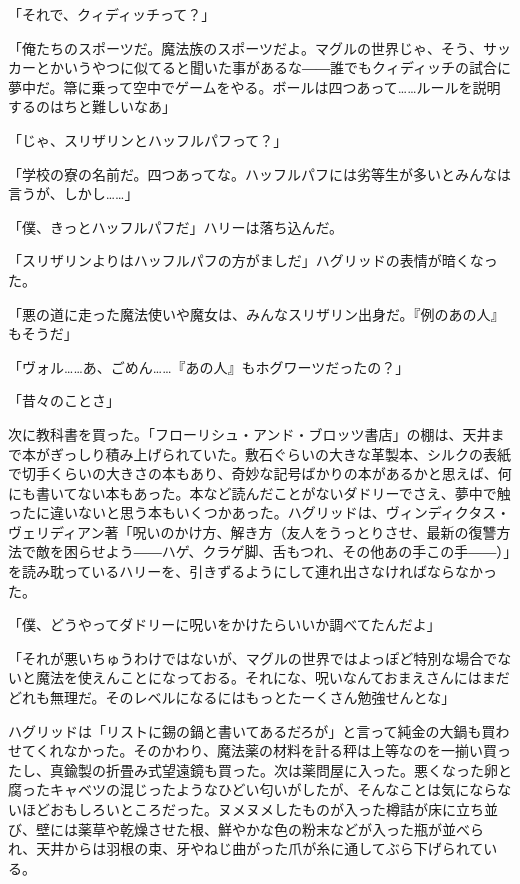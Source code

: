 \documentclass[10pt,a4paper]{article}
\begin{document}
\begin{CJK}{UTF8}{min}
「それで、クィディッチって？」

「俺たちのスポーツだ。魔法族のスポーツだよ。マグルの世界じゃ、そう、サッカーとかいうやつに似てると聞いた事があるな――誰でもクィディッチの試合に夢中だ。箒に乗って空中でゲームをやる。ボールは四つあって……ルールを説明するのはちと難しいなあ」

「じゃ、スリザリンとハッフルパフって？」

「学校の寮の名前だ。四つあってな。ハッフルパフには劣等生が多いとみんなは言うが、しかし……」

「僕、きっとハッフルパフだ」ハリーは落ち込んだ。

「スリザリンよりはハッフルパフの方がましだ」ハグリッドの表情が暗くなった。

「悪の道に走った魔法使いや魔女は、みんなスリザリン出身だ。『例のあの人』もそうだ」

「ヴォル……あ、ごめん……『あの人』もホグワーツだったの？」

「昔々のことさ」



次に教科書を買った。「フローリシュ・アンド・ブロッツ書店」の棚は、天井まで本がぎっしり積み上げられていた。敷石ぐらいの大きな革製本、シルクの表紙で切手くらいの大きさの本もあり、奇妙な記号ばかりの本があるかと思えば、何にも書いてない本もあった。本など読んだことがないダドリーでさえ、夢中で触ったに違いないと思う本もいくつかあった。ハグリッドは、ヴィンディクタス・ヴェリディアン著「呪いのかけ方、解き方（友人をうっとりさせ、最新の復讐方法で敵を困らせよう――ハゲ、クラゲ脚、舌もつれ、その他あの手この手――）」を読み耽っているハリーを、引きずるようにして連れ出さなければならなかった。

「僕、どうやってダドリーに呪いをかけたらいいか調べてたんだよ」

「それが悪いちゅうわけではないが、マグルの世界ではよっぽど特別な場合でないと魔法を使えんことになっておる。それにな、呪いなんておまえさんにはまだどれも無理だ。そのレベルになるにはもっとたーくさん勉強せんとな」

ハグリッドは「リストに錫の鍋と書いてあるだろが」と言って純金の大鍋も買わせてくれなかった。そのかわり、魔法薬の材料を計る秤は上等なのを一揃い買ったし、真鍮製の折畳み式望遠鏡も買った。次は薬問屋に入った。悪くなった卵と腐ったキャベツの混じったようなひどい匂いがしたが、そんなことは気にならないほどおもしろいところだった。ヌメヌメしたものが入った樽詰が床に立ち並び、壁には薬草や乾燥させた根、鮮やかな色の粉末などが入った瓶が並べられ、天井からは羽根の束、牙やねじ曲がった爪が糸に通してぶら下げられている。


\end{CJK}
\end{document}
